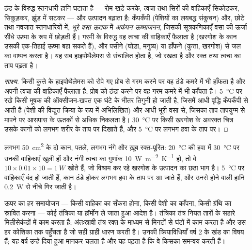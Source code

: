 \begin{proposition}[तापनियमन के साधन]\label{prop:b1:mammal-organization:thermoreg}
ठंड के विरुद्ध स्तनधारी हानि घटाता है --- रोम खड़े करके, त्वचा तथा
सिरों की वाहिकाएँ सिकोड़कर, सिकुड़कर, झुंड में सटकर --- और उत्पादन
बढ़ाता है: कँपकँपी (पेशियों का लयबद्ध संकुचन) और, छोटे तथा नवजात
स्तनधारियों में, \emph{भूरे वसा ऊतक} में
\emph{अकंपन ऊष्माजनन}, जिसकी सूत्रकणिकाएँ वसा की
ऊर्जा सीधे ऊष्मा के रूप में छोड़ती हैं। गरमी के विरुद्ध वह त्वचा की
वाहिकाएँ फैलाता है (खरगोश के कान उसकी एक-तिहाई ऊष्मा बहा सकते हैं), और
पसीने (घोड़ा, मनुष्य) या हाँफने (कुत्ता, खरगोश) से जल का वाष्पन करता है।
यह सब हाइपोथैलेमस से संचालित होता है, जो  रखता है और रक्त तथा
त्वचा का ताप पढ़ता है।
\end{proposition}
\begin{proof}[साक्ष्य]
किसी कुत्ते के हाइपोथैलेमस को रोपे गए प्रोब से गरम करने पर वह ठंडे कमरे
में भी हाँफता है और अपनी त्वचा की वाहिकाएँ फैलाता है; प्रोब को ठंडा करने
पर वह गरम कमरे में भी काँपता है। \qty{5}{\celsius} पर रखे किसी मूषक की
ऑक्सीजन-खपत एक घंटे के भीतर तिगुनी हो जाती है, जिसमें आधी वृद्धि कँपकँपी
से आती है (पेशी की विद्युत क्रिया के रूप में अभिलिखित) और आधी भूरी वसा
से, जिसका ताप तापयुग्म से मापने पर आसपास के ऊतकों से अधिक निकलता है।
\qty{30}{\celsius} पर किसी खरगोश के अवरक्त चित्र उसके कानों को लगभग
शरीर के ताप पर दिखाते हैं, और \qty{5}{\celsius} पर लगभग हवा के ताप पर।
\end{proof}

\begin{example}[खरगोश के कान]\label{ex:b1:mammal-organization:ears}
लगभग \qty{50}{cm^2} के दो कान, पतले, लगभग नंगे और ख़ूब रक्त-पूरित:
\qty{20}{\celsius} की हवा में \qty{30}{\celsius} पर उनकी वाहिकाएँ खुली
हों और नंगी त्वचा का गुणांक \qty{10}{W.m^{-2}.K^{-1}} हो, तो वे
$10\times 0.01\times 10 =
\qty{1}{W}$ खोते हैं, जो विश्राम कर रहे खरगोश के उत्पादन का छठा भाग है। \qty{5}{\celsius} पर वाहिकाएँ बंद हो जाती हैं,
कान ठंडे होकर लगभग हवा के ताप पर आ जाते हैं, और उनसे होने वाली हानि
\qty{0.2}{W} से नीचे गिर जाती है।
\end{example}

\begin{remark}[समन्वय]\label{rem:b1:mammal-organization:coordination}
ऊपर का हर समायोजन --- किसी वाहिका का सँकरा होना, किसी पेशी का काँपना,
किसी ग्रंथि का स्रावित करना --- कोई तंत्रिका या हॉर्मोन ले जाता हुआ आदेश
है। तंत्रिका तंत्र नियत तारों के सहारे मिलीसेकंडों में काम करता है;
अंतःस्रावी तंत्र रक्त के माध्यम से मिनटों से घंटों में काम करता है और उस
हर कोशिका तक पहुँचता है जो सही ग्राही धारण करती है। उनकी क्रियाविधियाँ
वर्ष 2 के खंड का विषय हैं; यह वर्ष उन्हें दिया हुआ मानकर चलता है और यह
पढ़ता है कि वे किसका समन्वय करती हैं।
\end{remark}

